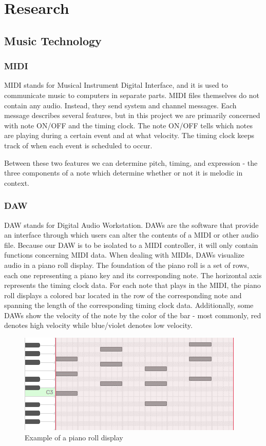 \section{Research}

\subsection{Music Technology}

\subsubsection{MIDI}

MIDI stands for Musical Instrument Digital Interface, and it is used to communicate music
to computers in separate parts. MIDI files themselves do not contain any audio. Instead, they
send system and channel messages. Each message describes several features, but in this project
we are primarily concerned with note ON/OFF and the timing clock. The note ON/OFF tells which
notes are playing during a certain event and at what velocity. The timing clock keeps track of
when each event is scheduled to occur.

Between these two features we can determine pitch, timing, and expression - the three
components of a note which determine whether or not it is melodic in context.

\subsubsection{DAW}
\label{sec:daw}

DAW stands for Digital Audio Workstation. DAWs are the software that provide an interface
through which users can alter the contents of a MIDI or other audio file. Because our DAW is
to be isolated to a MIDI controller, it  will only contain functions concerning MIDI data.
When dealing with MIDIs, DAWs visualize audio in a piano roll display. The foundation of the
piano roll is a set of rows, each one representing a piano key and its corresponding note.
The horizontal axis represents the timing clock data. For each note that plays in the MIDI, the
piano roll displays a colored bar located in the row of the corresponding note and spanning the
length of the corresponding timing clock data. Additionally, some DAWs show the velocity of the
note by the color of the bar - most commonly, red denotes high velocity while blue/violet
denotes low velocity.

\begin{figure}[h!]
  \centering
  \includegraphics{image/PianoRoll.png}
  \caption{Example of a piano roll display}
  \label{fig:piano_roll}
\end{figure}

